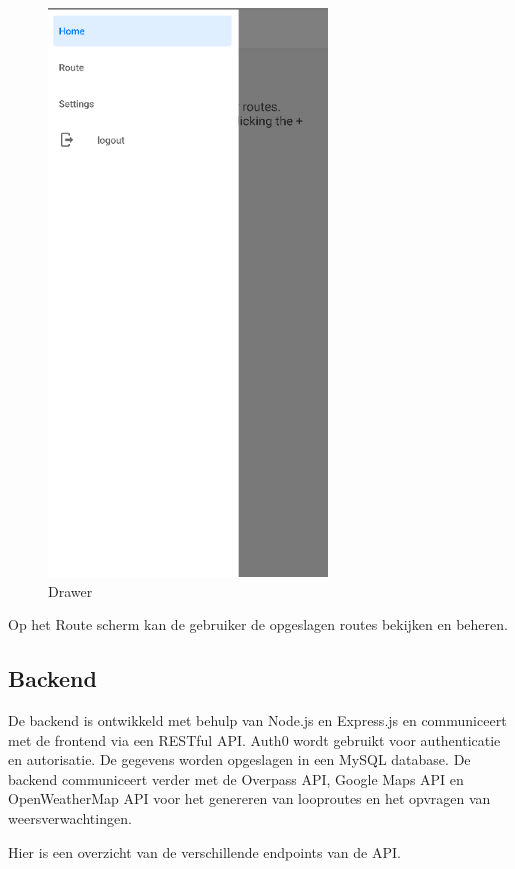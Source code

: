     \begin{figure}[htbp]
        \includegraphics[width=20em]{./graphics/drawer.png}
        \centering
        \caption{Drawer}
        \label{fig:drawer}
    \end{figure}

    Op het Route scherm kan de gebruiker de opgeslagen routes bekijken en beheren.

    \subsection{Backend}
    
    De backend is ontwikkeld met behulp van Node.js en Express.js en communiceert met de frontend via een RESTful API. 
    Auth0 wordt gebruikt voor authenticatie en autorisatie. De gegevens worden opgeslagen in een MySQL database. 
    De backend communiceert verder met de Overpass API, Google Maps API en OpenWeatherMap API voor het genereren van looproutes en het opvragen van weersverwachtingen.
    
    Hier is een overzicht van de verschillende endpoints van de API.
    
